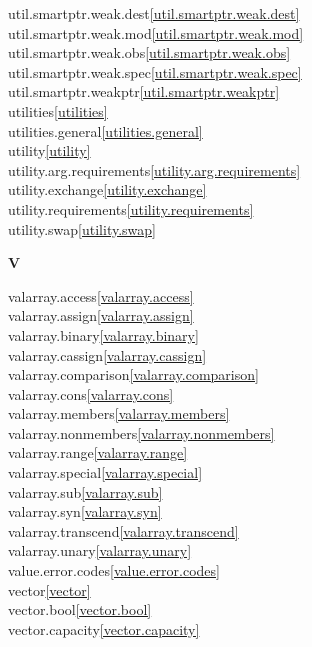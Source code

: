 \begin{multicols}{2}
util.smartptr.weak.dest\quad\ref{util.smartptr.weak.dest}\\
util.smartptr.weak.mod\quad\ref{util.smartptr.weak.mod}\\
util.smartptr.weak.obs\quad\ref{util.smartptr.weak.obs}\\
util.smartptr.weak.spec\quad\ref{util.smartptr.weak.spec}\\
util.smartptr.weakptr\quad\ref{util.smartptr.weakptr}\\
utilities\quad\ref{utilities}\\
utilities.general\quad\ref{utilities.general}\\
utility\quad\ref{utility}\\
utility.arg.requirements\quad\ref{utility.arg.requirements}\\
utility.exchange\quad\ref{utility.exchange}\\
utility.requirements\quad\ref{utility.requirements}\\
utility.swap\quad\ref{utility.swap}\\
\par \textbf{V}\par
valarray.access\quad\ref{valarray.access}\\
valarray.assign\quad\ref{valarray.assign}\\
valarray.binary\quad\ref{valarray.binary}\\
valarray.cassign\quad\ref{valarray.cassign}\\
valarray.comparison\quad\ref{valarray.comparison}\\
valarray.cons\quad\ref{valarray.cons}\\
valarray.members\quad\ref{valarray.members}\\
valarray.nonmembers\quad\ref{valarray.nonmembers}\\
valarray.range\quad\ref{valarray.range}\\
valarray.special\quad\ref{valarray.special}\\
valarray.sub\quad\ref{valarray.sub}\\
valarray.syn\quad\ref{valarray.syn}\\
valarray.transcend\quad\ref{valarray.transcend}\\
valarray.unary\quad\ref{valarray.unary}\\
value.error.codes\quad\ref{value.error.codes}\\
vector\quad\ref{vector}\\
vector.bool\quad\ref{vector.bool}\\
vector.capacity\quad\ref{vector.capacity}\\

\end{multicols}
